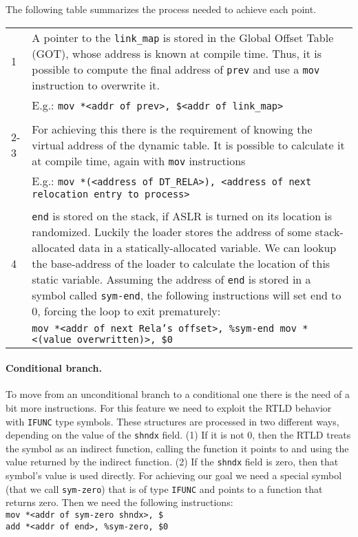 \documentclass[11pt,twoside,a4paper]{article}
\begin{document}
The following table summarizes the process needed to achieve each point.

\begin{longtable}{ l | p{} }
  \hline
  1 & A pointer to the \texttt{link\_map} is stored in the Global Offset Table (GOT), whose address is known at compile time. Thus, it is possible to compute the final address of \texttt{prev} and use a \texttt{mov} instruction to overwrite it. \\ & E.g.: \texttt{mov *<addr of prev>, \$<addr of link\_map>} \\ \hline \\
  2-3 & For achieving this there is the requirement of knowing the virtual address of the dynamic table. It is possible to calculate it at compile time, again with \texttt{mov} instructions \\ & E.g.: \texttt{mov *(<address of DT\_RELA>), <address of next relocation entry to process>} \\ \hline \\
  4 & \texttt{end} is stored on the stack, if ASLR is turned on its location is randomized. Luckily the loader stores the address of some stack-allocated data in a statically-allocated variable. We can lookup the base-address of the loader to calculate the location of this static variable. Assuming the
address of \texttt{end} is stored in a symbol called \texttt{sym-end}, the following instructions will set end to 0, forcing the loop to exit prematurely: \\
  & \texttt{mov *<addr of next Rela's offset>, \%sym-end mov *<(value overwritten)>, \$0} \\
  \hline
\end{longtable}

\paragraph{Conditional branch.} To move from an unconditional branch to a conditional one there is the need of a bit more instructions. For this feature we need to exploit the RTLD behavior with \texttt{IFUNC} type symbols. These structures are processed in two different ways, depending on the value of the \texttt{shndx} field. (1) If it is not 0, then the RTLD treats the symbol as an indirect function, calling the function it points to and using the value returned by the indirect function. (2) If the \texttt{shndx} field is zero, then that symbol's value is used directly.
For achieving our goal we need a special symbol (that we call \texttt{sym-zero}) that is of type \texttt{IFUNC} and points to a function that returns zero. Then we need the following instructions:\\
\texttt{mov *<addr of sym-zero shndx>, \$<test val>} \\
\texttt{add *<addr of end>, \%sym-zero, \$0}
\end{document}
